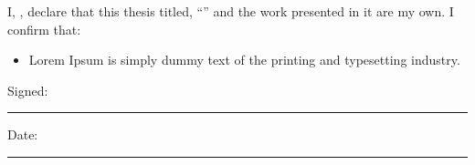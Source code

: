 
\begin{declaration}
    \addchaptertocentry{\authorshipname} %
    \noindent I, \authorname, declare that this thesis titled, \enquote{\ttitle} and the work presented in it are my own. I confirm that:
    
    \begin{itemize} 
    \item Lorem Ipsum is simply dummy text of the printing and typesetting industry. \\
    \end{itemize}
     
    \noindent Signed:\\
    \rule[0.5em]{25em}{0.5pt} %
     
    \noindent Date:\\
    \rule[0.5em]{25em}{0.5pt} %
    \end{declaration}
    
    \cleardoublepage
    
    